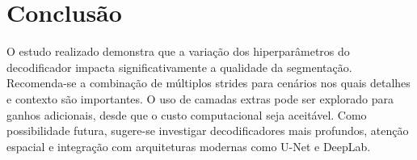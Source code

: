 \documentclass[%
 reprint,
 amsmath,amssymb,
 aps,
]{revtex4-2}
\begin{document}
\section{Conclusão}
O estudo realizado demonstra que a variação dos hiperparâmetros do decodificador impacta significativamente a qualidade da segmentação. Recomenda-se a combinação de múltiplos strides para cenários nos quais detalhes e contexto são importantes. O uso de camadas extras pode ser explorado para ganhos adicionais, desde que o custo computacional seja aceitável. Como possibilidade futura, sugere-se investigar decodificadores mais profundos, atenção espacial e integração com arquiteturas modernas como U-Net e DeepLab.



\end{document}
